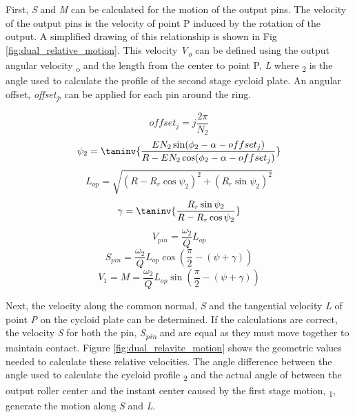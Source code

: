 First, \textit{S} and \textit{M} can be calculated for the motion of the output pins. The velocity of the output pins is the velocity of point P induced by the rotation of the output. A simplified drawing of this relationship is shown in Fig \ref{fig:dual_relative_motion}. This velocity \textit{V\textsubscript{o}} can be defined using the output angular velocity \textomega\textsubscript{o} and the length from the center to point P, \textit{L} where \textpsi\textsubscript{2} is the angle used to calculate the profile of the second stage cycloid plate. An angular offset, \textit{offset\textsubscript{j}}, can be applied for each pin around the ring. 

\begin{equation}\label{eq:offset2}
offset_j = j \frac{2\pi}{N_2}
\end{equation}
\begin{equation}\label{eq:psi2}
\psi_2 = \taninv{\frac{E N_2 \sin(\phi_2-\alpha-offset_j)}{R-E N_2\cos(\phi_2-\alpha-offset_j)}}
\end{equation}
\begin{equation} \label{eq:l_op}
L_{op} = \sqrt{(R-R_r\cos\psi_2)^2 + (R_r\sin\psi_2)^2}
\end{equation}
\begin{equation}
\gamma = \taninv{\frac{R_r\sin\psi_2}{R-R_r\cos\psi_2}}
\end{equation}
\begin{equation}
V_{pin} = \frac{\omega_2}{Q} L_{op}
\end{equation}
\begin{equation} \label{eq:s_pin}
S_{pin} = \frac{\omega_2}{Q} L_{op} \cos(\frac{\pi}{2}-(\psi+\gamma))
\end{equation}
\begin{equation}
V_{1} = M = \frac{\omega_2}{Q} L_{op} \sin(\frac{\pi}{2}-(\psi+\gamma))
\end{equation}


Next, the velocity along the common normal, \textit{S} and the tangential velocity \textit{L} of point \textit{P} on the cycloid plate can be determined. If the calculations are correct, the velocity \textit{S} for both the pin, \textit{S\textsubscript{pin}} and  are equal as they must move together to maintain contact. Figure \ref{fig:dual_relavite_motion} shows the geometric values needed to calculate these relative velocities. The angle difference between the angle used to calculate the cycloid profile \textpsi\textsubscript{2} and the actual angle of between the output roller center and the instant center caused by the first stage motion, \textpsi\textsubscript{1}, generate the motion along \textit{S} and \textit{L}. 

